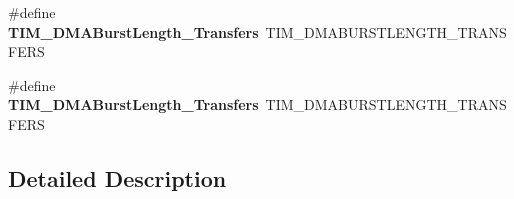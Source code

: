 \begin{DoxyCompactItemize}
\item 
\#define {\bfseries T\+I\+M\+\_\+\+D\+M\+A\+Burst\+Length\+\_\+Transfers}~T\+I\+M\+\_\+\+D\+M\+A\+B\+U\+R\+S\+T\+L\+E\+N\+G\+T\+H\+\_\+T\+R\+A\+N\+S\+F\+E\+RS\hypertarget{group___h_a_l___t_i_m___aliased___defines_ga5b2c97f650a3c1726965187d852b8cc5}{}\label{group___h_a_l___t_i_m___aliased___defines_ga5b2c97f650a3c1726965187d852b8cc5}

\item 
\#define {\bfseries T\+I\+M\+\_\+\+D\+M\+A\+Burst\+Length\+\_\+Transfers}~T\+I\+M\+\_\+\+D\+M\+A\+B\+U\+R\+S\+T\+L\+E\+N\+G\+T\+H\+\_\+T\+R\+A\+N\+S\+F\+E\+RS\hypertarget{group___h_a_l___t_i_m___aliased___defines_gaed9f2afef174079f6eb6927abd995b9b}{}\label{group___h_a_l___t_i_m___aliased___defines_gaed9f2afef174079f6eb6927abd995b9b}

\end{DoxyCompactItemize}


\subsection{Detailed Description}
